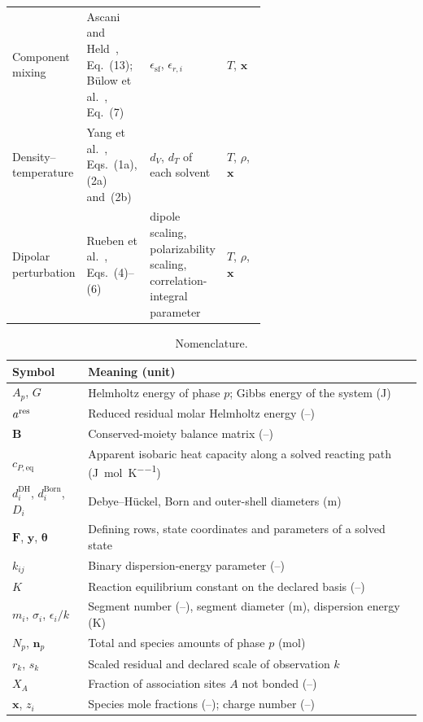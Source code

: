\begin{table}[pos=htbp]
\begin{tabularx}{\linewidth}{@{}>{\raggedright\arraybackslash}p{0.2\linewidth}>{\raggedright\arraybackslash}p{0.25\linewidth}>{\raggedright\arraybackslash}X>{\raggedright\arraybackslash}p{0.17\linewidth}@{}}
Component mixing & Ascani and Held~\citep{AscaniHeld2021}, Eq.~(13); B\"ulow et al.~\citep{Bulow2019}, Eq.~(7) & $\epsilon_{\mathrm{sf}}$, $\epsilon_{r,i}$ & $T$, $\mathbf{x}$ \\
Density--temperature & Yang et al.~\citep{Yang2024}, Eqs.~(1a), (2a) and~(2b) & $d_V$, $d_T$ of each solvent & $T$, $\rho$, $\mathbf{x}$ \\
Dipolar perturbation & Rueben et al.~\citep{Rueben2024}, Eqs.~(4)--(6) & dipole scaling, polarizability scaling, correlation-integral parameter & $T$, $\rho$, $\mathbf{x}$ \\
\bottomrule
\end{tabularx}
\end{table}

\begin{table}[pos=htbp]
\centering
\caption{Nomenclature.}
\label{tab:nomenclature}
\small
\begin{tabularx}{\linewidth}{@{}lX@{}}
\toprule
Symbol & Meaning (unit) \\
\midrule
$A_p$, $G$ & Helmholtz energy of phase $p$; Gibbs energy of the system (J) \\
$a^{\mathrm{res}}$ & Reduced residual molar Helmholtz energy (--) \\
$\mathbf{B}$ & Conserved-moiety balance matrix (--) \\
$c_{P,\mathrm{eq}}$ & Apparent isobaric heat capacity along a solved reacting path (\si{\joule\per\mol\per\kelvin}) \\
$d_i^{\mathrm{DH}}$, $d_i^{\mathrm{Born}}$, $D_i$ & Debye--H\"uckel, Born and outer-shell diameters (m) \\
$\mathbf{F}$, $\mathbf{y}$, $\boldsymbol\theta$ & Defining rows, state coordinates and parameters of a solved state \\
$k_{ij}$ & Binary dispersion-energy parameter (--) \\
$K$ & Reaction equilibrium constant on the declared basis (--) \\
$m_i$, $\sigma_i$, $\epsilon_i/k$ & Segment number (--), segment diameter (m), dispersion energy (K) \\
$N_p$, $\mathbf{n}_p$ & Total and species amounts of phase $p$ (mol) \\
$r_k$, $s_k$ & Scaled residual and declared scale of observation $k$ \\
$X_A$ & Fraction of association sites $A$ not bonded (--) \\
$\mathbf{x}$, $z_i$ & Species mole fractions (--); charge number (--) \\

\end{tabularx}
\end{table}
